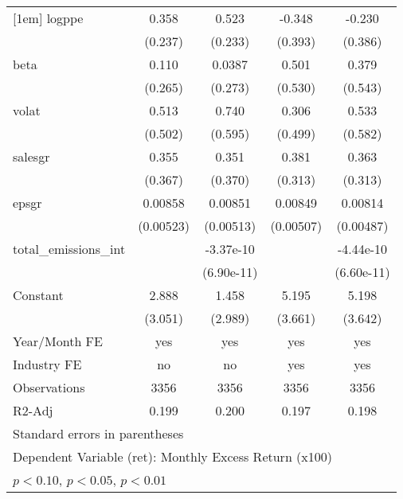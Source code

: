 \begin{table}[htbp]
\begin{tabular}{l*{4}{c}}
[1em]
logppe              &       0.358         &       0.523\sym{**} &      -0.348         &      -0.230         \\
                    &     (0.237)         &     (0.233)         &     (0.393)         &     (0.386)         \\
[1em]
beta                &       0.110         &      0.0387         &       0.501         &       0.379         \\
                    &     (0.265)         &     (0.273)         &     (0.530)         &     (0.543)         \\
[1em]
volat               &       0.513         &       0.740         &       0.306         &       0.533         \\
                    &     (0.502)         &     (0.595)         &     (0.499)         &     (0.582)         \\
[1em]
salesgr             &       0.355         &       0.351         &       0.381         &       0.363         \\
                    &     (0.367)         &     (0.370)         &     (0.313)         &     (0.313)         \\
[1em]
epsgr               &     0.00858         &     0.00851         &     0.00849\sym{*}  &     0.00814\sym{*}  \\
                    &   (0.00523)         &   (0.00513)         &   (0.00507)         &   (0.00487)         \\
[1em]
total\_emissions\_int &                     &   -3.37e-10\sym{***}&                     &   -4.44e-10\sym{***}\\
                    &                     &  (6.90e-11)         &                     &  (6.60e-11)         \\
[1em]
Constant            &       2.888         &       1.458         &       5.195         &       5.198         \\
                    &     (3.051)         &     (2.989)         &     (3.661)         &     (3.642)         \\
\hline
Year/Month FE       &         yes         &         yes         &         yes         &         yes         \\
Industry FE         &          no         &          no         &         yes         &         yes         \\
Observations        &        3356         &        3356         &        3356         &        3356         \\
R2-Adj              &       0.199         &       0.200         &       0.197         &       0.198         \\
\hline\hline
\multicolumn{5}{l}{\footnotesize Standard errors in parentheses}\\
\multicolumn{5}{l}{\footnotesize Dependent Variable (ret): Monthly Excess Return (x100)}\\
\multicolumn{5}{l}{\footnotesize \sym{*} \(p<0.10\), \sym{**} \(p<0.05\), \sym{***} \(p<0.01\)}\\
\end{tabular}
\end{table}
